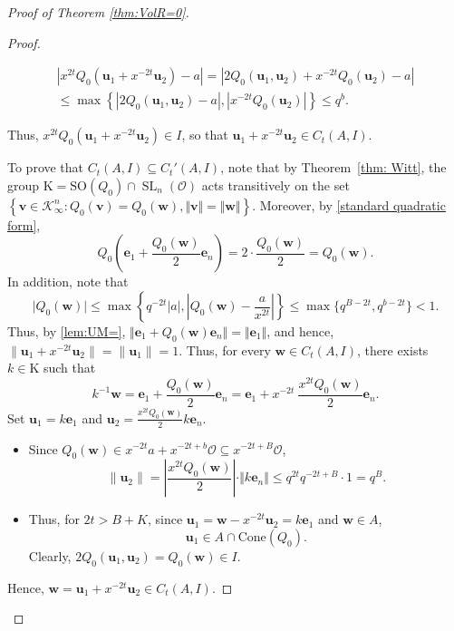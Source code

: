 \documentclass[10pt,a4paper]{amsart}
\newcommand{\Cone}{\mathrm{Cone}}
\newcommand{\SO}{{\mathrm{SO}}}
\begin{document}
\begin{proof}[Proof of Theorem \ref{thm:VolR=0}]
\begin{proof}
\begin{itemize}
\begin{equation}
\begin{split}
\left| x^{2t}Q_0(\mathbf u_1 + x^{-2t}\mathbf u_2)-a\right|
=\left| 2Q_0(\mathbf u_1, \mathbf u_2)+x^{-2t}Q_0(\mathbf u_2)-a\right|\\
\leq \max\left\{\left| 2Q_0(\mathbf{u}_1,\mathbf{u}_2)-a\right|,\left|x^{-2t}Q_0(\mathbf{u}_2)\right|\right\}\leq q^b.
\end{split}
\end{equation}
\end{itemize}
Thus, $x^{2t}Q_0(\mathbf{u}_1+x^{-2t}\mathbf{u}_2)\in I$, so that $\mathbf{u}_1+x^{-2t}\mathbf{u}_2\in C_t(A,I)$. 
\vspace{5pt}

\noindent To prove that $C_t(A,I)\subseteq C_t'(A,I)$, note that by Theorem~\ref{thm: Witt}, the group $\mathrm{K}=\SO(Q_0)\cap \operatorname{SL}_n(\mathcal{O})$ acts transitively on the set $\left\{\mathbf{v}\in \mathcal{K}_{\infty}^n:Q_0(\mathbf{v})=Q_0(\mathbf{w}),\Vert \mathbf{v}\Vert=\Vert \mathbf{w}\Vert\right\}$. Moreover, by \eqref{standard quadratic form},
$$Q_0\left(\mathbf{e}_1+\frac{Q_0(\mathbf{w})}{2}\mathbf{e}_n\right)=2\cdot \frac{Q_0(\mathbf{w})}{2}=Q_0(\mathbf{w}).$$
In addition, note that $$\vert Q_0(\mathbf{w})\vert\leq \max\left\{q^{-2t}\vert a\vert,\left|Q_0(\mathbf{w})-\frac{a}{x^{2t}}\right|\right\}\leq \max\{q^{B-2t},q^{b-2t}\}<1.$$ Thus, by \eqref{lem:UM=}, $\Vert\mathbf{e}_1+Q_0(\mathbf{w})\mathbf{e}_n\Vert=\Vert \mathbf{e}_1\Vert$, and hence, $\|\mathbf u_1+x^{-2t}\mathbf u_2\|=\|\mathbf u_1\|=1$.
Thus, for every $\mathbf w\in C_t(A,I)$, there exists $k\in \mathrm{K}$ such that
\[
k^{-1}\mathbf w=\mathbf{e}_1+\frac{Q_0(\mathbf{w})}{2}\mathbf{e}_n=\mathbf e_1+ x^{-2t}\:\frac {x^{2t}Q_0(\mathbf w)} 2\mathbf e_n.
\]
Set $\mathbf u_1=k\mathbf e_1$ and $\mathbf u_2=\frac {x^{2t}Q_0(\mathbf w)} 2 k\mathbf e_n$. 


\begin{itemize} 
\item Since $Q_0(\mathbf w)\in x^{-2t}a+x^{-2t+b}\mathcal O\subseteq x^{-2t+B}\mathcal{O}$,
\[
\|\mathbf u_2\|=\left| \frac {x^{2t}Q_0(\mathbf w)}{2}\right|\cdot \Vert k\mathbf{e}_n\Vert\le q^{2t}q^{-2t+B}\cdot 1=q^B.
\]
\vspace{1pt}
\item Thus, for $2t>B+K$, since $\mathbf u_1=\mathbf w- x^{-2t}\mathbf u_2=k\mathbf{e}_1$ and $\mathbf w\in A$,
\[
\mathbf u_1 \in A \cap \Cone(Q_0).
\]
Clearly, $2Q_0(\mathbf u_1, \mathbf u_2)=Q_0(\mathbf w)\in I$.
\end{itemize}
Hence, $\mathbf{w}=\mathbf{u}_1+x^{-2t}\mathbf{u}_2\in C_t(A,I)$.
\vspace{5pt}


\end{proof}
\end{proof}
\end{document}
